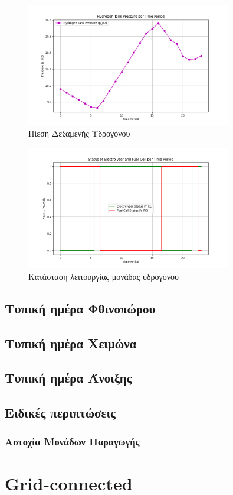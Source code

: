 \begin{figure}[H]  %
    \centering
    \includegraphics[width=0.8\textwidth]{figures/Figure_6.png}  %
    \caption{Πίεση Δεξαμενής Υδρογόνου}
    \label{fig:my_label}
\end{figure}

\begin{figure}[H]  %
    \centering
    \includegraphics[width=0.8\textwidth]{figures/Figure_7.png}  %
    \caption{Κατάσταση λειτουργίας μονάδας υδρογόνου}
    \label{fig:my_label}
\end{figure}

\subsection{Τυπική ημέρα Φθινοπώρου}
\subsection{Τυπική ημέρα Χειμώνα}
\subsection{Τυπική ημέρα Άνοιξης}

\subsection{Ειδικές περιπτώσεις}
\subsubsection{Αστοχία Μονάδων Παραγωγής}

\en
\section{Grid-connected}

\gr